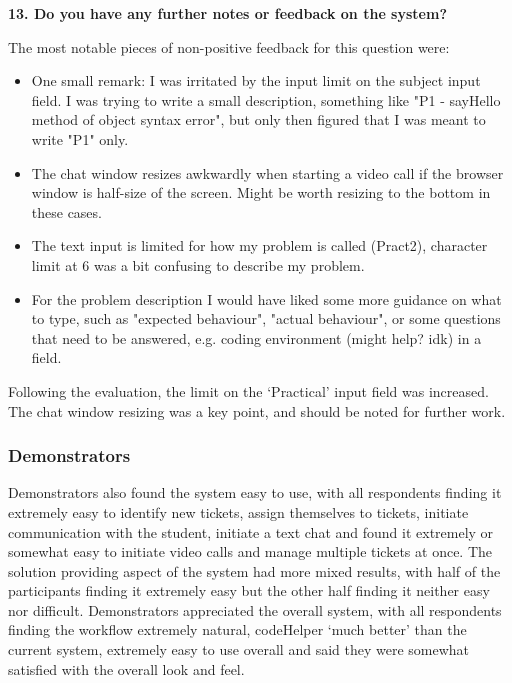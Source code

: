 \textbf{13. Do you have any further notes or feedback on the system?}\par\medskip

The most notable pieces of non-positive feedback for this question were:

\begin{itemize}
    \item One small remark: I was irritated by the input limit on the subject input field. I was trying to write a small description, something like "P1 - sayHello method of object syntax error", but only then figured that I was meant to write "P1" only.
    \item The chat window resizes awkwardly when starting a video call if the browser window is half-size of the screen. Might be worth resizing to the bottom in these cases.	
    \item The text input is limited for how my problem is called (Pract2), character limit at 6 was a bit confusing to describe my problem.
    \item For the problem description I would have liked some more guidance on what to type, such as "expected behaviour", "actual behaviour", or some questions that need to be answered, e.g. coding environment (might help? idk) in a field.
\end{itemize}

Following the evaluation, the limit on the `Practical' input field was increased. The chat window resizing was a key point, and should be noted for further work.

\subsubsection{Demonstrators}

Demonstrators also found the system easy to use, with all respondents finding it extremely easy to identify new tickets, assign themselves to tickets, initiate communication with the student, initiate a text chat and found it extremely or somewhat easy to initiate video calls and manage multiple tickets at once. The solution providing aspect of the system had more mixed results, with half of the participants finding it extremely easy but the other half finding it neither easy nor difficult. Demonstrators appreciated the overall system, with all respondents finding the workflow extremely natural, codeHelper `much better' than the current system, extremely easy to use overall and said they were somewhat satisfied with the overall look and feel.

